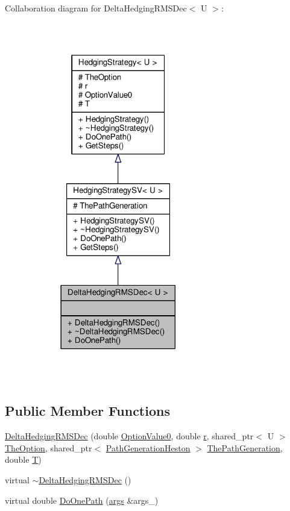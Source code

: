 Collaboration diagram for Delta\+Hedging\+R\+M\+S\+Dec$<$ U $>$\+:
\nopagebreak
\begin{figure}[H]
\begin{center}
\leavevmode
\includegraphics[width=222pt]{classDeltaHedgingRMSDec__coll__graph}
\end{center}
\end{figure}
\subsection*{Public Member Functions}
\begin{DoxyCompactItemize}
\item 
\hyperlink{classDeltaHedgingRMSDec_a47c0fd66e96b5c75dfc999883e4124d3}{Delta\+Hedging\+R\+M\+S\+Dec} (double \hyperlink{classHedgingStrategy_ac96528e9f4e5a0d1e5aadcc2ebdcab55}{Option\+Value0}, double \hyperlink{classHedgingStrategy_a313da7bc1911dba2a166d2c7bed5f1d7}{r}, shared\+\_\+ptr$<$ U $>$ \hyperlink{classHedgingStrategy_a65699a183423af9d947bb939ae8e907d}{The\+Option}, shared\+\_\+ptr$<$ \hyperlink{classPathGenerationHeston}{Path\+Generation\+Heston} $>$ \hyperlink{classHedgingStrategySV_aa341650c5b2846606e59e3e6c6225aca}{The\+Path\+Generation}, double \hyperlink{classHedgingStrategy_aedb4069f0709b49482a72b9d9c906a5e}{T})
\item 
virtual \hyperlink{classDeltaHedgingRMSDec_ac01f0ab7f61f34e2d02b2be0a4f109c0}{$\sim$\+Delta\+Hedging\+R\+M\+S\+Dec} ()
\item 
virtual double \hyperlink{classDeltaHedgingRMSDec_aa9118ce56921178e38a7ed8a6acee656}{Do\+One\+Path} (\hyperlink{path__generation_8h_a75c13cde2074f502cc4348c70528572d}{args} \&args\+\_\+)
\end{DoxyCompactItemize}
